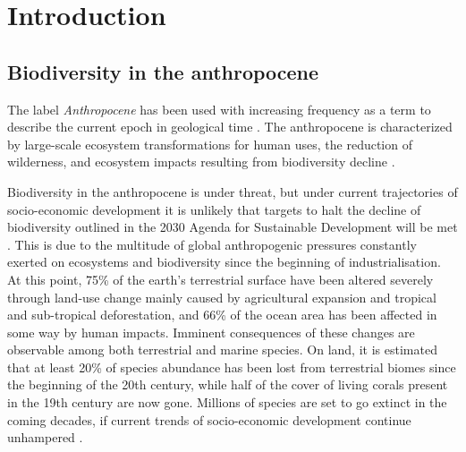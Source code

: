 \chapter{Introduction}\label{ch1}
\newpage

\section{Biodiversity in the anthropocene}

The label \textit{Anthropocene} has been used with increasing frequency as a term to describe the current epoch in geological time \citep{corlett_anthropocene_2015, seddon_biodiversity_2016, pearson_biodiversity_2020}. The anthropocene is characterized by large-scale ecosystem transformations for human uses, the reduction of wilderness, and ecosystem impacts resulting from biodiversity decline \citep{seddon_biodiversity_2016}. 

Biodiversity in the anthropocene is under threat, but under current trajectories of socio-economic development it is unlikely that targets to halt the decline of biodiversity outlined in the 2030 Agenda for Sustainable Development will be met \citep{ipbes_summary_2019, un_general_assembly_transforming_2015}. This is due to the multitude of global anthropogenic pressures constantly exerted on ecosystems and biodiversity since the beginning of industrialisation. At this point, 75\% of the earth's terrestrial surface have been altered severely through land-use change mainly caused by agricultural expansion and tropical and sub-tropical deforestation, and 66\% of the ocean area has been affected in some way by human impacts. Imminent consequences of these changes are observable among both terrestrial and marine species. On land, it is estimated that at least 20\% of species abundance has been lost from terrestrial biomes since the beginning of the 20th century, while half of the cover of living corals present in the 19th century are now gone. Millions of species are set to go extinct in the coming decades, if current trends of socio-economic development continue unhampered \citep{ipbes_summary_2019}.


